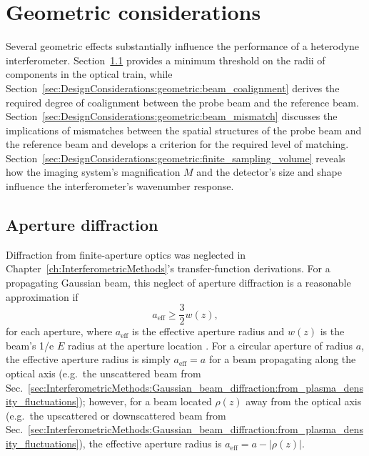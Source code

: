 \section{Geometric considerations}
\label{sec:DesignConsiderations:geometric}
Several geometric effects substantially influence
the performance of a heterodyne interferometer.
Section~\ref{sec:DesignConsiderations:geometric:aperture_diffraction}
provides a minimum threshold on the radii of components in the optical train,
while Section~\ref{sec:DesignConsiderations:geometric:beam_coalignment}
derives the required degree of coalignment between
the probe beam and the reference beam.
Section~\ref{sec:DesignConsiderations:geometric:beam_mismatch}
discusses the implications of mismatches between
the spatial structures of the probe beam and the reference beam and
develops a criterion for the required level of matching.
Section~\ref{sec:DesignConsiderations:geometric:finite_sampling_volume}
reveals how the imaging system's magnification $M$ and
the detector's size and shape
influence the interferometer's wavenumber response.


\subsection{Aperture diffraction}
\label{sec:DesignConsiderations:geometric:aperture_diffraction}
Diffraction from finite-aperture optics was neglected in
Chapter~\ref{ch:InterferometricMethods}'s
transfer-function derivations.
For a propagating Gaussian beam,
this neglect of aperture diffraction is a reasonable approximation if
\begin{equation}
  a_{\text{eff}} \geq \frac{3}{2} w(z),
  \label{eq:DesignConsiderations:aperture_radius_for_minimal_diffraction}
\end{equation}
for each aperture, where
$a_{\text{eff}}$ is the effective aperture radius and
$w(z)$ is the beam's 1/e $E$ radius at the aperture location
\cite{campbell_josa69, rost_diffraction_pc14}.
For a circular aperture of radius $a$,
the effective aperture radius is simply $a_{\text{eff}} = a$
for a beam propagating along the optical axis
(e.g.\ the unscattered beam from
Sec.~\ref{sec:InterferometricMethods:Gaussian_beam_diffraction:from_plasma_density_fluctuations});
however, for a beam located $\rho(z)$ away from the optical axis
(e.g.\ the upscattered or downscattered beam from
Sec.~\ref{sec:InterferometricMethods:Gaussian_beam_diffraction:from_plasma_density_fluctuations}),
the effective aperture radius is $a_{\text{eff}} = a - |\rho(z)|$.


